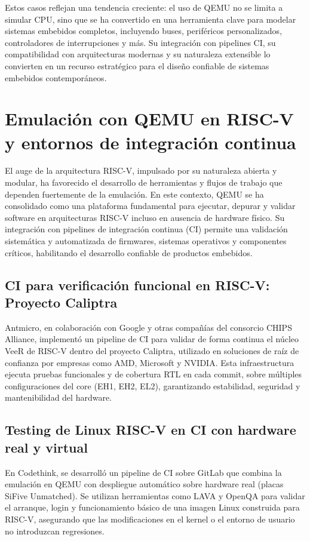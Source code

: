 \vspace{1em}
Estos casos reflejan una tendencia creciente: el uso de QEMU no se limita a simular CPU, sino que se ha convertido en una herramienta clave para modelar sistemas embebidos completos, incluyendo buses, periféricos personalizados, controladores de interrupciones y más. Su integración con pipelines CI, su compatibilidad con arquitecturas modernas y su naturaleza extensible lo convierten en un recurso estratégico para el diseño confiable de sistemas embebidos contemporáneos.
\section{Emulación con QEMU en RISC-V y entornos de integración continua}
\label{subsec:riscv-ci-industria}

El auge de la arquitectura RISC-V, impulsado por su naturaleza abierta y modular, ha favorecido el desarrollo de herramientas y flujos de trabajo que dependen fuertemente de la emulación. En este contexto, QEMU se ha consolidado como una plataforma fundamental para ejecutar, depurar y validar software en arquitecturas RISC-V incluso en ausencia de hardware físico. Su integración con pipelines de integración continua (CI) permite una validación sistemática y automatizada de firmwares, sistemas operativos y componentes críticos, habilitando el desarrollo confiable de productos embebidos.

\subsection*{CI para verificación funcional en RISC-V: Proyecto Caliptra}

Antmicro, en colaboración con Google y otras compañías del consorcio CHIPS Alliance, implementó un pipeline de CI para validar de forma continua el núcleo VeeR de RISC-V dentro del proyecto Caliptra, utilizado en soluciones de raíz de confianza por empresas como AMD, Microsoft y NVIDIA. Esta infraestructura ejecuta pruebas funcionales y de cobertura RTL en cada commit, sobre múltiples configuraciones del core (EH1, EH2, EL2), garantizando estabilidad, seguridad y mantenibilidad del hardware.

\subsection*{Testing de Linux RISC-V en CI con hardware real y virtual}

En Codethink, se desarrolló un pipeline de CI sobre GitLab que combina la emulación en QEMU con despliegue automático sobre hardware real (placas SiFive Unmatched). Se utilizan herramientas como LAVA y OpenQA para validar el arranque, login y funcionamiento básico de una imagen Linux construida para RISC-V, asegurando que las modificaciones en el kernel o el entorno de usuario no introduzcan regresiones.

